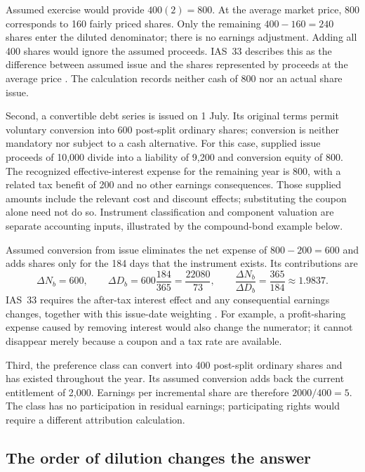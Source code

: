 Assumed exercise would provide $400(2)=800$. At the average market price,
800 corresponds to 160 fairly priced shares. Only the remaining
$400-160=240$ shares enter the diluted denominator; there is no earnings
adjustment. Adding all 400 shares would ignore the assumed proceeds.
IAS~33 describes this as the difference between assumed issue and the
shares represented by proceeds at the average price
\citep[IAS~33, paragraphs 45--47 and A4--A5]{eu20231803}.
The calculation records neither cash of 800 nor an actual share issue.

Second, a convertible debt series is issued on 1 July. Its original terms
permit voluntary conversion into 600 post-split ordinary shares; conversion
is neither mandatory nor subject to a cash alternative. For this case,
supplied issue proceeds of 10,000 divide into a liability of 9,200 and
conversion equity of 800. The recognized effective-interest expense for
the remaining year is 800, with a related tax benefit of 200 and no other
earnings consequences. Those supplied amounts include the relevant
cost and discount effects; substituting the coupon alone need not do so.
Instrument classification and component valuation are separate accounting
inputs, illustrated by the compound-bond example below.

Assumed conversion from issue eliminates the net expense of
$800-200=600$ and adds shares only for the 184 days that the instrument
exists. Its contributions are
\[
 \Delta N_b=600,\qquad
 \Delta D_b=600\frac{184}{365}=\frac{22080}{73},
 \qquad
 \frac{\Delta N_b}{\Delta D_b}=\frac{365}{184}\approx1.9837.
\]
IAS~33 requires the after-tax interest effect and any consequential
earnings changes, together with this issue-date weighting
\citep[IAS~33, paragraphs 33--39, 49--50]{eu20231803}.
For example, a profit-sharing expense caused by removing interest would
also change the numerator; it cannot disappear merely because a coupon
and a tax rate are available.

Third, the preference class can convert into 400 post-split ordinary
shares and has existed throughout the year. Its assumed conversion adds
back the current entitlement of 2,000. Earnings per incremental share
are therefore $2000/400=5$. The class has no participation in residual
earnings; participating rights would require a different attribution
calculation.

\subsection{The order of dilution changes the answer}

